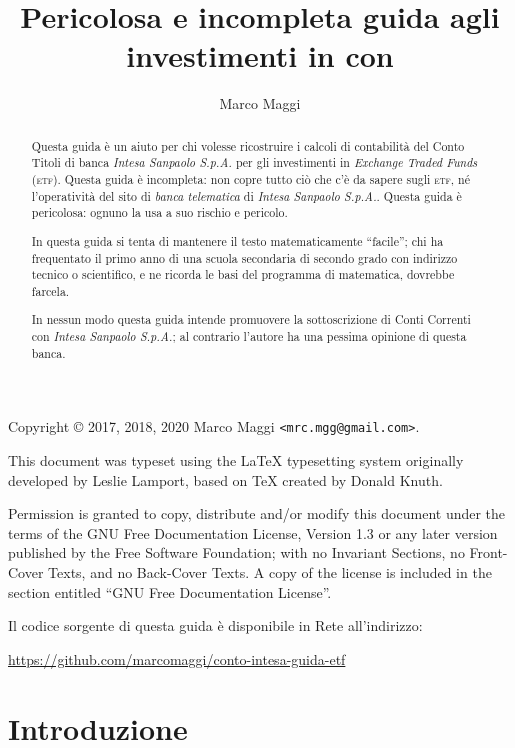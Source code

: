 \documentclass[12pt,a4paper]{article}
\author{Marco Maggi}
\title{Pericolosa e incompleta guida agli investimenti in \Etf{} con \IntesaSanpaolo{}}
\newcommand{\IntesaSanpaolo}[0]{\emph{Intesa Sanpaolo S.p.A.}}
\newcommand{\Parentesi}[1]{(#1)}
\newcommand{\Etf}[1]{\textsc{etf}}
\begin{document}
\maketitle

\begin{abstract}
  \noindent
  Questa guida è un  aiuto per chi volesse ricostruire i calcoli di  contabilità del Conto Titoli di
  banca \IntesaSanpaolo{} per  gli investimenti in \emph{Exchange  Traded Funds} \Parentesi{\Etf{}}.
  Questa guida è  incompleta: non copre tutto ciò  che c'è da sapere sugli  \Etf{}, né l'operatività
  del sito  di \emph{banca telematica} di  \IntesaSanpaolo{}.  Questa guida è  pericolosa: ognuno la
  usa a suo rischio e pericolo.

  In questa guida si  tenta di mantenere il testo matematicamente ``facile'';  chi ha frequentato il
  primo anno  di una scuola secondaria  di secondo grado con  indirizzo tecnico o scientifico,  e ne
  ricorda le basi del programma di matematica, dovrebbe farcela.

  In  nessun  modo  questa  guida  intende  promuovere  la  sottoscrizione  di  Conti  Correnti  con
  \IntesaSanpaolo{}; al contrario l'autore ha una pessima opinione di questa banca.
\end{abstract}

\tableofcontents

\newpage{}

\noindent
Copyright \copyright{} 2017, 2018, 2020 Marco Maggi \texttt{<mrc.mgg@gmail.com>}.

This  document was  typeset using  the \LaTeX{}  typesetting system  originally developed  by Leslie
Lamport, based on \TeX{} created by Donald Knuth.

Permission is  granted to copy, distribute  and/or modify this document  under the terms of  the GNU
Free  Documentation License,  Version  1.3 or  any  later  version published  by  the Free  Software
Foundation; with no  Invariant Sections, no Front-Cover  Texts, and no Back-Cover Texts.   A copy of
the license is included in the section entitled ``GNU Free Documentation License''.

Il codice sorgente di questa guida è disponibile in Rete all'indirizzo:
\begin{center}
  \url{https://github.com/marcomaggi/conto-intesa-guida-etf}
\end{center}

\newpage{}


\section{Introduzione}
\end{document}
